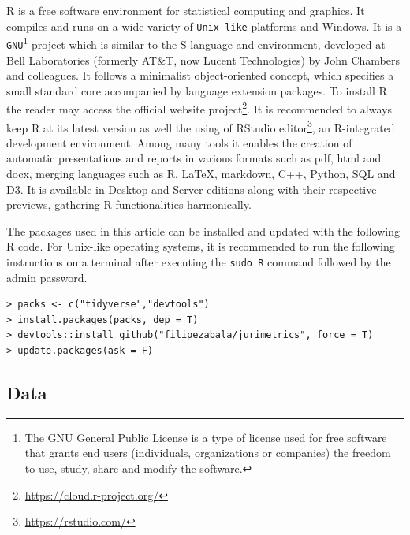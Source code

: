 \documentclass[a4paper]{exam}
\theoremstyle{plain}
\begin{document}
R is a free software environment for statistical computing and graphics. It compiles and runs on a wide variety of \href{https://en.wikipedia.org/wiki/Unix-like}{\nolinkurl{Unix-like}} platforms and Windows. It is a \href{https://www.gnu.org/}{\nolinkurl{GNU}}\footnote{ The GNU General Public License is a type of license used for free software that grants end users (individuals, organizations or companies) the freedom to use, study, share and modify the software.} project which is similar to the S language and environment, developed at Bell Laboratories (formerly AT\&T, now Lucent Technologies) by John Chambers and colleagues. It follows a minimalist object-oriented concept, which specifies a small standard core accompanied by language extension packages. To install R the reader may access the official website project\footnote{ \url{https://cloud.r-project.org/}}. It is recommended to always keep R at its latest version as well the using of RStudio editor\footnote{ \url{https://rstudio.com/}}, an R-integrated development environment. Among many tools it enables the creation of automatic presentations and reports in various formats such as pdf, html and docx, merging languages such as R, \LaTeX, markdown, C++, Python, SQL and D3. It is available in Desktop and Server editions along with their respective previews, gathering R functionalities harmonically.

The packages used in this article can be installed and updated with the following R code. For Unix-like operating systems, it is recommended to run the following instructions on a terminal after executing the \texttt{sudo R} command followed by the admin password.

\begin{tcolorbox}[colback=black, coltext=white]
\begingroup
\fontsize{9pt}{9pt}\selectfont
\begin{verbatim}
> packs <- c("tidyverse","devtools")
> install.packages(packs, dep = T)
> devtools::install_github("filipezabala/jurimetrics", force = T)
> update.packages(ask = F)
\end{verbatim}
\endgroup
\end{tcolorbox}


\subsection{Data}\label{sec:data}
\end{document}
